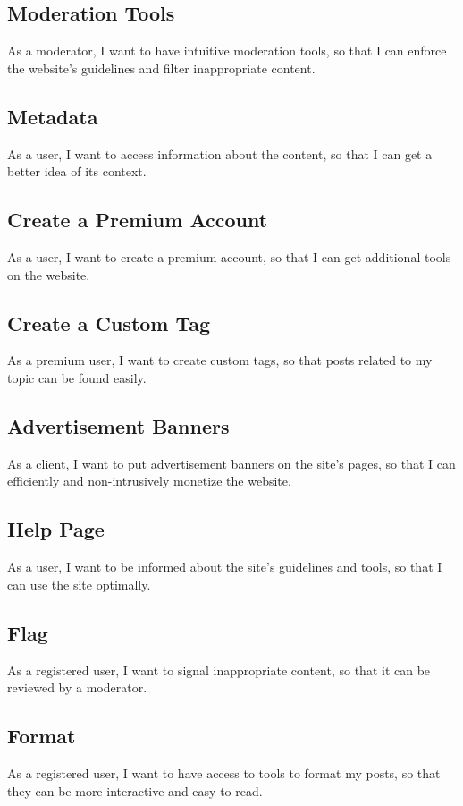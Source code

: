 \documentclass [a4paper, 12pt] {article}
\begin{document}
\subsection{Moderation Tools}
As a moderator, I want to have intuitive moderation tools, so that I can enforce the website's guidelines and filter inappropriate content.

\subsection{Metadata}
As a user, I want to access information about the content, so that I can get a better idea of its context.

\subsection{Create a Premium Account}
As a user, I want to create a premium account, so that I can get additional tools on the website.

\subsection{Create a Custom Tag}
As a premium user, I want to create custom tags, so that posts related to my topic can be found easily.

\subsection{Advertisement Banners}
As a client, I want to put advertisement banners on the site's pages, so that I can efficiently and non-intrusively monetize the website.

\subsection{Help Page}
As a user, I want to be informed about the site's guidelines and tools, so that I can use the site optimally.

\subsection{Flag}
As a registered user, I want to signal inappropriate content, so that it can be reviewed by a moderator.

\subsection{Format}
As a registered user, I want to have access to tools to format my posts, so that they can be more interactive and easy to read.
\end{document}
